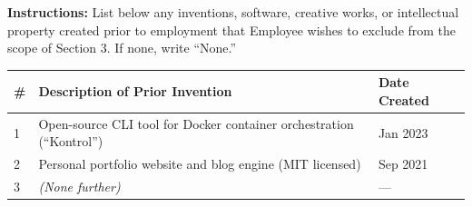 \documentclass[11pt,a4paper]{article}
\begin{document}
\vspace{16pt}
\begin{tcolorbox}[ndabox, title={\faFile\enspace Exhibit A --- Prior Inventions Disclosure}]
  \small
  \textbf{Instructions:} List below any inventions, software, creative works, or intellectual
  property created prior to employment that Employee wishes to exclude from the scope of
  Section 3. If none, write ``None.''

  \vspace{8pt}

  \begin{tabularx}{\linewidth}{@{}lXl@{}}
    \toprule
    \rowcolor{NavyDeep!12}
    \textbf{\#} & \textbf{Description of Prior Invention} & \textbf{Date Created} \\
    \midrule
    1 & Open-source CLI tool for Docker container orchestration (``Kontrol'') & Jan 2023 \\
    \rowcolor{SilverLight}
    2 & Personal portfolio website and blog engine (MIT licensed) & Sep 2021 \\
    3 & \textit{(None further)} & --- \\
    \bottomrule
  \end{tabularx}
\end{tcolorbox}


\vspace{20pt}
\end{document}

